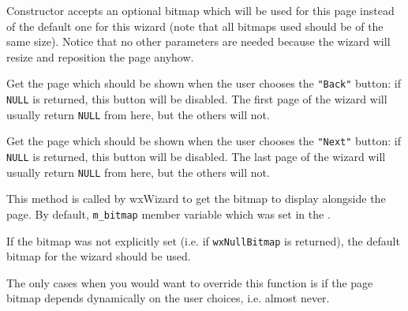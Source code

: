 \label{wxwizardpagewxwizardpage}


Constructor accepts an optional bitmap which will be used for this page
instead of the default one for this wizard (note that all bitmaps used should
be of the same size). Notice that no other parameters are needed because the
wizard will resize and reposition the page anyhow.

\label{wxwizardpagegetprev}


Get the page which should be shown when the user chooses the {\tt "Back"}
button: if {\tt NULL} is returned, this button will be disabled. The first
page of the wizard will usually return {\tt NULL} from here, but the others
will not.



\label{wxwizardpagegetnext}


Get the page which should be shown when the user chooses the {\tt "Next"}
button: if {\tt NULL} is returned, this button will be disabled. The last
page of the wizard will usually return {\tt NULL} from here, but the others
will not.



\label{wxwizardpagegetbitmap}


This method is called by wxWizard to get the bitmap to display alongside the
page. By default, {\tt m\_bitmap} member variable which was set in the 
.

If the bitmap was not explicitly set (i.e. if {\tt wxNullBitmap} is returned),
the default bitmap for the wizard should be used.

The only cases when you would want to override this function is if the page
bitmap depends dynamically on the user choices, i.e. almost never.


